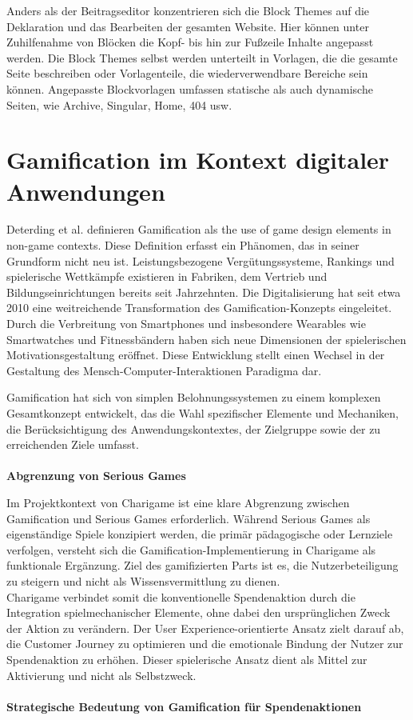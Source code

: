 Anders als der Beitragseditor konzentrieren sich die Block Themes auf die Deklaration und das Bearbeiten der gesamten Website.
Hier können unter Zuhilfenahme von Blöcken die Kopf- bis hin zur Fußzeile Inhalte angepasst werden.
Die Block Themes selbst werden unterteilt in Vorlagen, die die gesamte Seite beschreiben oder Vorlagenteile, die wiederverwendbare Bereiche sein können.
Angepasste Blockvorlagen umfassen statische als auch dynamische Seiten, wie Archive, Singular, Home, 404 usw. \cite{wordpress2024EditorTemplates}


\section{Gamification im Kontext digitaler Anwendungen}

Deterding et al. definieren Gamification als \grqq{}the use of game design elements in non-game contexts\grqq{}. \cite{deterding2011gamification}
Diese Definition erfasst ein Phänomen, das in seiner Grundform nicht neu ist.
Leistungsbezogene Vergütungssysteme, Rankings und spielerische Wettkämpfe existieren in Fabriken, dem Vertrieb und Bildungseinrichtungen bereits seit Jahrzehnten. \cite{bpb2023gamification}
Die Digitalisierung hat seit etwa 2010 eine weitreichende Transformation des Gamification-Konzepts eingeleitet.
Durch die Verbreitung von Smartphones und insbesondere Wearables wie Smartwatches und Fitnessbändern haben sich neue Dimensionen der spielerischen Motivationsgestaltung eröffnet. \cite{sailer2016gamification}
Diese Entwicklung stellt einen Wechsel in der Gestaltung des Mensch-Computer-Interaktionen Paradigma dar.

Gamification hat sich von simplen Belohnungssystemen zu einem komplexen Gesamtkonzept entwickelt, das die Wahl spezifischer Elemente und Mechaniken, die Berücksichtigung des Anwendungskontextes, der Zielgruppe sowie der zu erreichenden Ziele umfasst. \cite{bpb2023gamification}
\\\\
\textbf{Abgrenzung von Serious Games}

Im Projektkontext von Charigame ist eine klare Abgrenzung zwischen Gamification und Serious Games erforderlich.
Während Serious Games als eigenständige Spiele konzipiert werden, die primär pädagogische oder Lernziele verfolgen, versteht sich die Gamification-Implementierung in Charigame als funktionale Ergänzung.
Ziel des gamifizierten Parts ist es, die Nutzerbeteiligung zu steigern und nicht als Wissensvermittlung zu dienen.
\\
Charigame verbindet somit die konventionelle Spendenaktion durch die Integration spielmechanischer Elemente, ohne dabei den ursprünglichen Zweck der Aktion zu verändern.
Der User Experience-orientierte Ansatz zielt darauf ab, die Customer Journey zu optimieren und die emotionale Bindung der Nutzer zur Spendenaktion zu erhöhen.
Dieser spielerische Ansatz dient als Mittel zur Aktivierung und nicht als Selbstzweck.
\\\\
\textbf{Strategische Bedeutung von Gamification für Spendenaktionen}

